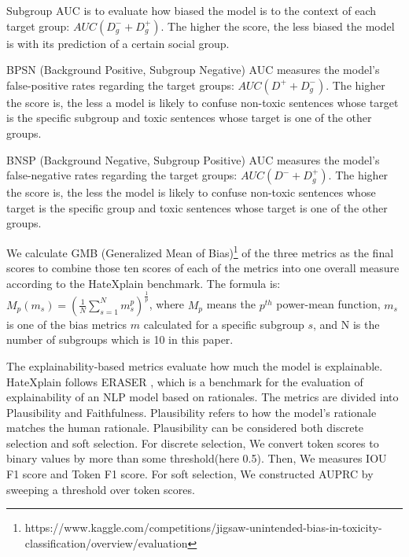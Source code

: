 \documentclass[11pt]{article}
\begin{document}
Subgroup AUC is to evaluate how biased the model is to the context of each target group: $AUC(D_{g}^{-} + D_{g}^{+})$.
The higher the score, the less biased the model is with its prediction of a certain social group. 


BPSN (Background Positive, Subgroup Negative) AUC measures the model's false-positive rates regarding the target groups: $AUC(D^{+} + D_{g}^{-})$. 
The higher the score is, the less a model is likely to confuse non-toxic sentences whose target is the specific subgroup and toxic sentences whose target is one of the other groups. 


BNSP (Background Negative, Subgroup Positive) AUC measures the model's false-negative rates regarding the target groups: $AUC(D^{-} + D_{g}^{+})$. The higher the score is, the less the model is likely to confuse non-toxic sentences whose target is the specific group and toxic sentences whose target is one of the other groups. 


We calculate GMB (Generalized Mean of Bias)\footnote[1]{https://www.kaggle.com/competitions/jigsaw-unintended-bias-in-toxicity-classification/overview/evaluation} 
of the three metrics as the final scores to combine those ten scores of each of the metrics into one overall measure according to the HateXplain benchmark.
The formula is: $M_{p}(m_{s}) = (\frac{1}{N}\sum_{s=1}^{N}m_{s}^{p})^\frac{1}{p}$, where $M_{p}$ means the $p^{th}$ power-mean function, $m_{s}$ is one of the bias metrics $m$ calculated for a specific subgroup $s$, and N is the number of subgroups which is 10 in this paper. 




The explainability-based metrics evaluate how much the model is explainable. HateXplain follows ERASER \citep{deyoung2019eraser}, which is a benchmark for the evaluation of explainability of an NLP model based on rationales. The metrics are divided into Plausibility and Faithfulness. Plausibility refers to how the model's rationale matches the human rationale. Plausibility can be considered both discrete selection and soft selection. For discrete selection, We convert token scores to binary values by more than some threshold(here 0.5). Then, We measures IOU F1 score and Token F1 score. For soft selection, We constructed AUPRC by sweeping a threshold over token scores.
\end{document}
